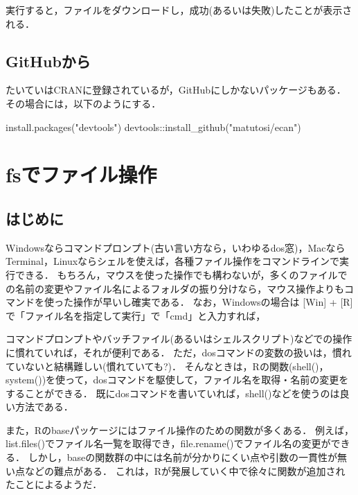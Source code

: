 \documentclass[
]{article}
\newenvironment{Shaded}{\begin{snugshade}}{\end{snugshade}}
\newcommand{\FunctionTok}[1]{\textcolor[rgb]{0.00,0.00,0.00}{#1}}
\newcommand{\NormalTok}[1]{#1}
\newcommand{\SpecialCharTok}[1]{\textcolor[rgb]{0.00,0.00,0.00}{#1}}
\newcommand{\StringTok}[1]{\textcolor[rgb]{0.31,0.60,0.02}{#1}}
\begin{document}
実行すると，ファイルをダウンロードし，成功(あるいは失敗)したことが表示される．

\hypertarget{github}{%
\subsection{GitHubから}\label{github}}

たいていはCRANに登録されているが，GitHubにしかないパッケージもある．
その場合には，以下のようにする．

\begin{Shaded}
\begin{Highlighting}[]
\FunctionTok{install.packages}\NormalTok{(}\StringTok{"devtools"}\NormalTok{)}
\NormalTok{devtools}\SpecialCharTok{::}\FunctionTok{install\_github}\NormalTok{(}\StringTok{"matutosi/ecan"}\NormalTok{)}
\end{Highlighting}
\end{Shaded}

\hypertarget{fs}{%
\section{fsでファイル操作}\label{fs}}

\hypertarget{ux306fux3058ux3081ux306b-1}{%
\subsection{はじめに}\label{ux306fux3058ux3081ux306b-1}}

Windowsならコマンドプロンプト(古い言い方なら，いわゆるdos窓)，MacならTerminal，Linuxならシェルを使えば，各種ファイル操作をコマンドラインで実行できる．
もちろん，マウスを使った操作でも構わないが，多くのファイルでの名前の変更やファイル名によるフォルダの振り分けなら，マウス操作よりもコマンドを使った操作が早いし確実である．
なお，Windowsの場合は {[}Win{]} + {[}R{]} で「ファイル名を指定して実行」で「cmd」と入力すれば，

コマンドプロンプトやバッチファイル(あるいはシェルスクリプト)などでの操作に慣れていれば，それが便利である．
ただ，dosコマンドの変数の扱いは，慣れていないと結構難しい(慣れていても?)．
そんなときは，Rの関数(shell()，system())を使って，dosコマンドを駆使して，ファイル名を取得・名前の変更をすることができる．
既にdosコマンドを書いていれば，shell()などを使うのは良い方法である．

また，Rのbaseパッケージにはファイル操作のための関数が多くある．
例えば，list.files()でファイル名一覧を取得でき，file.rename()でファイル名の変更ができる．
しかし，baseの関数群の中には名前が分かりにくい点や引数の一貫性が無い点などの難点がある．
これは，Rが発展していく中で徐々に関数が追加されたことによるようだ．
\end{document}
